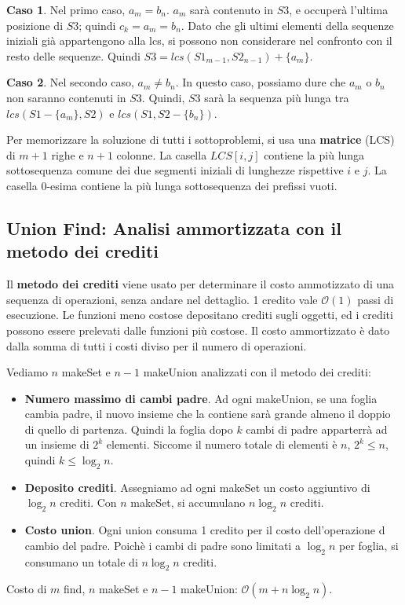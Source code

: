 \documentclass[11pt]{article}
\begin{document}
\textbf{Caso 1}. Nel primo caso, $a_m=b_n$. $a_m$ sarà contenuto in $S3$, e occuperà l'ultima posizione di $S3$; quindi 
$c_k=a_m=b_n$. Dato che gli ultimi elementi della sequenze iniziali già appartengono alla lcs, si possono non considerare
nel confronto con il resto delle sequenze. Quindi $S3=lcs(S1_{m-1},S2_{n-1})+\{a_m\}$.

\textbf{Caso 2}. Nel secondo caso, $a_m\neq b_n$. In questo caso, possiamo dure che $a_m$ o $b_n$ non saranno contenuti 
in $S3$. Quindi, $S3$ sarà la sequenza più lunga tra $lcs(S1-\{a_m\},S2)$ e $lcs(S1,S2-\{b_n\})$.

Per memorizzare la soluzione di tutti i sottoproblemi, si usa una \textbf{matrice} (LCS) di $m+1$ righe e $n+1$ colonne. La 
casella $LCS[i,j]$ contiene la più lunga sottosequenza comune dei due segmenti iniziali di lunghezze rispettive $i$ e $j$.
La casella 0-esima contiene la più lunga sottosequenza dei prefissi vuoti.
\subsection*{Union Find: Analisi ammortizzata con il metodo dei crediti}
Il \textbf{metodo dei crediti} viene usato per determinare il costo ammotizzato di una sequenza di operazioni, senza andare 
nel dettaglio. 1 credito vale $\mathcal{O}(1)$ passi di esecuzione. Le funzioni meno costose depositano crediti sugli oggetti,
ed i crediti possono essere prelevati dalle funzioni più costose. Il costo ammortizzato è dato dalla somma di tutti i costi 
diviso per il numero di operazioni.

Vediamo $n$ makeSet e $n-1$ makeUnion analizzati con il metodo dei crediti:
\begin{itemize}
    \item \textbf{Numero massimo di cambi padre}. Ad ogni makeUnion, se una foglia cambia padre, il nuovo insieme che la
    contiene sarà grande almeno il doppio di quello di partenza. Quindi la foglia dopo $k$ cambi di padre apparterrà ad 
    un insieme di $2^k$ elementi. Siccome il numero totale di elementi è $n$, $2^k\leq n$, quindi $k\leq \log_2n$.
    \item \textbf{Deposito crediti}. Assegniamo ad ogni makeSet un costo aggiuntivo di $\log_2n$ crediti. Con $n$ makeSet, 
    si accumulano $n\log_2n$ crediti.
    \item \textbf{Costo union}. Ogni union consuma 1 credito per il costo dell'operazione d cambio del padre. Poichè i cambi 
    di padre sono limitati a $\log_2n$ per foglia, si consumano un totale di $n\log_2n$ crediti.
\end{itemize}
Costo di $m$ find, $n$ makeSet e $n-1$ makeUnion: $\mathcal{O}(m+n\log_2n)$.
\end{document}

